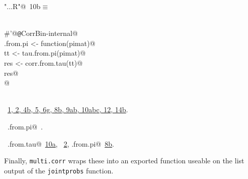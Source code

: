 \documentclass[reqno]{amsart}
\renewcommand{\NWtarget}[2]{\hypertarget{#1}{#2}}
\renewcommand{\NWlink}[2]{\hyperlink{#1}{#2}}
\begin{document}
\begin{flushleft} \small\label{scrap42}\raggedright\small
\NWtarget{nuweb10b}{} \verb@"..\R\ExchMultinomial.R"@\nobreak\ {\footnotesize {10b}}$\equiv$
\vspace{-1ex}
\begin{list}{}{} \item
\mbox{}\verb@@\\
\mbox{}\verb@#'@{\tt @}\verb@rdname CorrBin-internal@\\
\mbox{}\verb@corr.from.pi <- function(pimat){@\\
\mbox{}\verb@  tt <- tau.from.pi(pimat)@\\
\mbox{}\verb@  res <- corr.from.tau(tt)@\\
\mbox{}\verb@  res@\\
\mbox{}\verb@}@\\
\mbox{}\verb@@\\
\mbox{}\verb@@{\NWsep}
\end{list}
\vspace{-1.5ex}
\footnotesize
\begin{list}{}{\setlength{\itemsep}{-\parsep}\setlength{\itemindent}{-\leftmargin}}
\item \NWtxtFileDefBy\ \NWlink{nuweb1}{1}\NWlink{nuweb2}{, 2}\NWlink{nuweb4b}{, 4b}\NWlink{nuweb5}{, 5}\NWlink{nuweb6g}{, 6g}\NWlink{nuweb8b}{, 8b}\NWlink{nuweb9a}{, 9a}\NWlink{nuweb9b}{b}\NWlink{nuweb10a}{, 10a}\NWlink{nuweb10b}{b}\NWlink{nuweb10c}{c}\NWlink{nuweb12}{, 12}\NWlink{nuweb14b}{, 14b}.
\item \NWtxtIdentsDefed\nobreak\  \verb@corr.from.pi@\nobreak\ \NWtxtIdentsNotUsed.\item \NWtxtIdentsUsed\nobreak\  \verb@corr.from.tau@\nobreak\ \NWlink{nuweb10a}{10a}, \verb@tau@\nobreak\ \NWlink{nuweb2}{2}, \verb@tau.from.pi@\nobreak\ \NWlink{nuweb8b}{8b}.
\item{}
\end{list}
\vspace{4ex}
\end{flushleft}
Finally, \texttt{multi.corr} wraps these into an exported function useable on the list output of the
\texttt{jointprobs} function.
\end{document}

